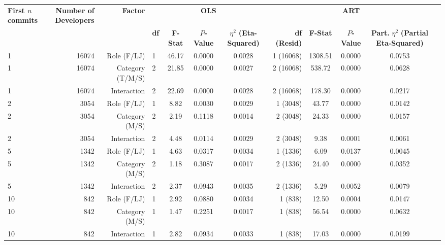 \begin{landscape}
\begin{table}[H]
{}
\begin{tabular}{l r r l ccc r ccc r}
\toprule
\makecell[t]{\textbf{First $n$}\\\textbf{commits}} & \makecell[t]{\textbf{Number of}\\\textbf{Developers}} & \textbf{Factor} & \multicolumn{4}{c}{\textbf{OLS}} & \multicolumn{4}{c}{\textbf{ART}} \\ 
\cmidrule(lr){4-7} \cmidrule(lr){8-11}
 &  &  & \textbf{df} & \textbf{F-Stat} & \textbf{$P$-Value} & \makecell[t]{\textbf{$\eta^2$}\\\textbf{(Eta-Squared)}} & \textbf{df (Resid)} & \textbf{F-Stat} & \textbf{$P$-Value} & \makecell[t]{\textbf{Part.}\\\textbf{$\eta^2$}\\\textbf{(Partial}\\\textbf{Eta-Squared)}} \\ 
\midrule
1 & 16074 & Role (F/LJ) & 1 & 46.17 & 0.0000 & 0.0028 & 1 (16068) & 1308.51 & 0.0000 & 0.0753 \\ 
1 & 16074 & Category (T/M/S) & 2 & 21.85 & 0.0000 & 0.0027 & 2 (16068) & 538.72 & 0.0000 & 0.0628 \\ 
1 & 16074 & Interaction & 2 & 22.69 & 0.0000 & 0.0028 & 2 (16068) & 178.30 & 0.0000 & 0.0217 \\ 
2 & 3054 & Role (F/LJ) & 1 & 8.82 & 0.0030 & 0.0029 & 1 (3048) & 43.77 & 0.0000 & 0.0142 \\ 
2 & 3054 & Category (M/S) & 2 & 2.19 & 0.1118 & 0.0014 & 2 (3048) & 24.33 & 0.0000 & 0.0157 \\ 
2 & 3054 & Interaction & 2 & 4.48 & 0.0114 & 0.0029 & 2 (3048) & 9.38 & 0.0001 & 0.0061 \\ 
5 & 1342 & Role (F/LJ) & 1 & 4.63 & 0.0317 & 0.0034 & 1 (1336) & 6.09 & 0.0137 & 0.0045 \\ 
5 & 1342 & Category (M/S) & 2 & 1.18 & 0.3087 & 0.0017 & 2 (1336) & 24.40 & 0.0000 & 0.0352 \\ 
5 & 1342 & Interaction & 2 & 2.37 & 0.0943 & 0.0035 & 2 (1336) & 5.29 & 0.0052 & 0.0079 \\ 
10 & 842 & Role (F/LJ) & 1 & 2.92 & 0.0880 & 0.0034 & 1 (838) & 12.50 & 0.0004 & 0.0147 \\ 
10 & 842 & Category (M/S) & 1 & 1.47 & 0.2251 & 0.0017 & 1 (838) & 56.54 & 0.0000 & 0.0632 \\ 
10 & 842 & Interaction & 1 & 2.82 & 0.0934 & 0.0033 & 1 (838) & 17.03 & 0.0000 & 0.0199 \\ 
\bottomrule
\end{tabular}%
\label{tab:codebase_graph_latex_repository_graph_component_time_series_ART_anova_classes} 
\end{table}
\end{landscape}
\newpage 
